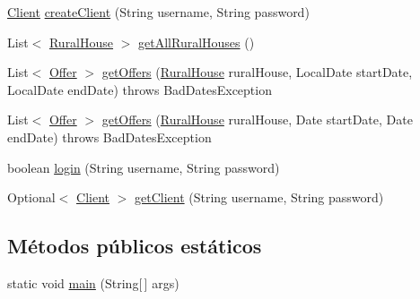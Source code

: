 \begin{DoxyCompactItemize}
\item 
\mbox{\hyperlink{classcom_1_1ruralhousejsf_1_1domain_1_1_client}{Client}} \mbox{\hyperlink{classcom_1_1ruralhousejsf_1_1business_logic_1_1_application_facade_impl_ae48e63f3df5226e46e4a57a64d120823}{create\+Client}} (String username, String password)
\item 
List$<$ \mbox{\hyperlink{classcom_1_1ruralhousejsf_1_1domain_1_1_rural_house}{Rural\+House}} $>$ \mbox{\hyperlink{classcom_1_1ruralhousejsf_1_1business_logic_1_1_application_facade_impl_a22bb7d4b98f51470315a81cd0d6f2290}{get\+All\+Rural\+Houses}} ()
\item 
List$<$ \mbox{\hyperlink{classcom_1_1ruralhousejsf_1_1domain_1_1_offer}{Offer}} $>$ \mbox{\hyperlink{classcom_1_1ruralhousejsf_1_1business_logic_1_1_application_facade_impl_a131acc04c80b3860f98d713d3a8ea5a5}{get\+Offers}} (\mbox{\hyperlink{classcom_1_1ruralhousejsf_1_1domain_1_1_rural_house}{Rural\+House}} rural\+House, Local\+Date start\+Date, Local\+Date end\+Date)  throws Bad\+Dates\+Exception 
\item 
List$<$ \mbox{\hyperlink{classcom_1_1ruralhousejsf_1_1domain_1_1_offer}{Offer}} $>$ \mbox{\hyperlink{classcom_1_1ruralhousejsf_1_1business_logic_1_1_application_facade_impl_a178d3964ff871edce1f5a207331319ed}{get\+Offers}} (\mbox{\hyperlink{classcom_1_1ruralhousejsf_1_1domain_1_1_rural_house}{Rural\+House}} rural\+House, Date start\+Date, Date end\+Date)  throws Bad\+Dates\+Exception 
\item 
boolean \mbox{\hyperlink{classcom_1_1ruralhousejsf_1_1business_logic_1_1_application_facade_impl_a7af883dece6a0de1e1be2b83e3d4a23f}{login}} (String username, String password)
\item 
Optional$<$ \mbox{\hyperlink{classcom_1_1ruralhousejsf_1_1domain_1_1_client}{Client}} $>$ \mbox{\hyperlink{classcom_1_1ruralhousejsf_1_1business_logic_1_1_application_facade_impl_a249a902aa3507a04fb15ab5fcf1f082c}{get\+Client}} (String username, String password)
\end{DoxyCompactItemize}
\subsection*{Métodos públicos estáticos}
\begin{DoxyCompactItemize}
\item 
static void \mbox{\hyperlink{classcom_1_1ruralhousejsf_1_1business_logic_1_1_application_facade_impl_a19d9b0706fe39437efc379c3bc747e06}{main}} (String\mbox{[}$\,$\mbox{]} args)
\end{DoxyCompactItemize}
